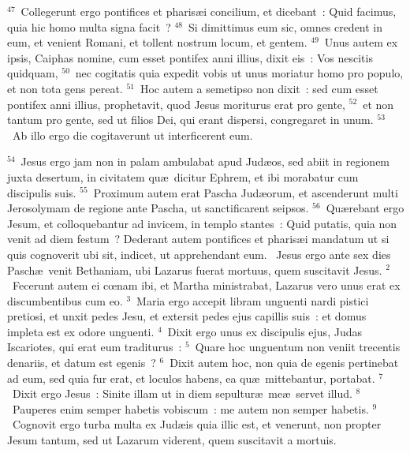 ${}^{47}$~Collegerunt ergo pontifices et pharis\ae i concilium, et dicebant~: Quid facimus, quia hic homo multa signa facit~?
${}^{48}$~Si dimittimus eum sic, omnes credent in eum, et venient Romani, et tollent nostrum locum, et gentem.
${}^{49}$~Unus autem ex ipsis, Caiphas nomine, cum esset pontifex anni illius, dixit eis~: Vos nescitis quidquam,
${}^{50}$~nec cogitatis quia expedit vobis ut unus moriatur homo pro populo, et non tota gens pereat.
${}^{51}$~Hoc autem a semetipso non dixit~: sed cum esset pontifex anni illius, prophetavit, quod Jesus moriturus erat pro gente,
${}^{52}$~et non tantum pro gente, sed ut filios Dei, qui erant dispersi, congregaret in unum.
${}^{53}$~Ab illo ergo die cogitaverunt ut interficerent eum.


${}^{54}$~Jesus ergo jam non in palam ambulabat apud Jud\ae os, sed abiit in regionem juxta desertum, in civitatem qu\ae\ dicitur Ephrem, et ibi morabatur cum discipulis suis.
${}^{55}$~Proximum autem erat Pascha Jud\ae orum, et ascenderunt multi Jerosolymam de regione ante Pascha, ut sanctificarent seipsos.
${}^{56}$~Qu\ae rebant ergo Jesum, et colloquebantur ad invicem, in templo stantes~: Quid putatis, quia non venit ad diem festum~? Dederant autem pontifices et pharis\ae i mandatum ut si quis cognoverit ubi sit, indicet, ut apprehendant eum.
~\lettrine[lines=10,image=true,loversize=0.05,lraise=-0.03]{J}{}esus ergo ante sex dies Pasch\ae\ venit Bethaniam, ubi Lazarus fuerat mortuus, quem suscitavit Jesus.
${}^{2}$~Fecerunt autem ei cœnam ibi, et Martha ministrabat, Lazarus vero unus erat ex discumbentibus cum eo.
${}^{3}$~Maria ergo accepit libram unguenti nardi pistici pretiosi, et unxit pedes Jesu, et extersit pedes ejus capillis suis~: et domus impleta est ex odore unguenti.
${}^{4}$~Dixit ergo unus ex discipulis ejus, Judas Iscariotes, qui erat eum traditurus~:
${}^{5}$~Quare hoc unguentum non veniit trecentis denariis, et datum est egenis~?
${}^{6}$~Dixit autem hoc, non quia de egenis pertinebat ad eum, sed quia fur erat, et loculos habens, ea qu\ae\ mittebantur, portabat.
${}^{7}$~Dixit ergo Jesus~: Sinite illam ut in diem sepultur\ae\ me\ae\ servet illud.
${}^{8}$~Pauperes enim semper habetis vobiscum~: me autem non semper habetis.
${}^{9}$~Cognovit ergo turba multa ex Jud\ae is quia illic est, et venerunt, non propter Jesum tantum, sed ut Lazarum viderent, quem suscitavit a mortuis.


